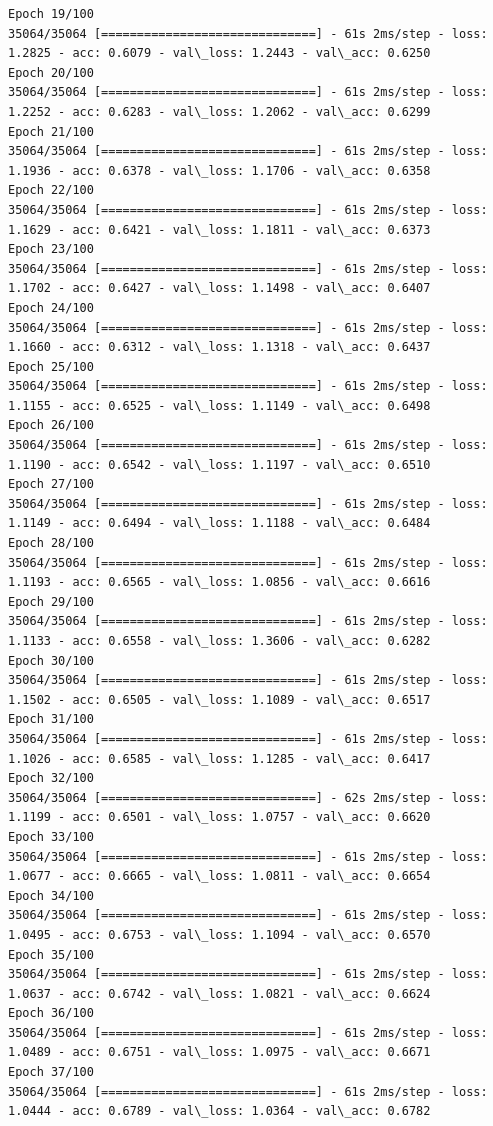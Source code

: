 \documentclass[11pt]{article}
\begin{document}
\begin{Verbatim}[commandchars=\\\{\}]
Epoch 19/100
35064/35064 [==============================] - 61s 2ms/step - loss: 1.2825 - acc: 0.6079 - val\_loss: 1.2443 - val\_acc: 0.6250
Epoch 20/100
35064/35064 [==============================] - 61s 2ms/step - loss: 1.2252 - acc: 0.6283 - val\_loss: 1.2062 - val\_acc: 0.6299
Epoch 21/100
35064/35064 [==============================] - 61s 2ms/step - loss: 1.1936 - acc: 0.6378 - val\_loss: 1.1706 - val\_acc: 0.6358
Epoch 22/100
35064/35064 [==============================] - 61s 2ms/step - loss: 1.1629 - acc: 0.6421 - val\_loss: 1.1811 - val\_acc: 0.6373
Epoch 23/100
35064/35064 [==============================] - 61s 2ms/step - loss: 1.1702 - acc: 0.6427 - val\_loss: 1.1498 - val\_acc: 0.6407
Epoch 24/100
35064/35064 [==============================] - 61s 2ms/step - loss: 1.1660 - acc: 0.6312 - val\_loss: 1.1318 - val\_acc: 0.6437
Epoch 25/100
35064/35064 [==============================] - 61s 2ms/step - loss: 1.1155 - acc: 0.6525 - val\_loss: 1.1149 - val\_acc: 0.6498
Epoch 26/100
35064/35064 [==============================] - 61s 2ms/step - loss: 1.1190 - acc: 0.6542 - val\_loss: 1.1197 - val\_acc: 0.6510
Epoch 27/100
35064/35064 [==============================] - 61s 2ms/step - loss: 1.1149 - acc: 0.6494 - val\_loss: 1.1188 - val\_acc: 0.6484
Epoch 28/100
35064/35064 [==============================] - 61s 2ms/step - loss: 1.1193 - acc: 0.6565 - val\_loss: 1.0856 - val\_acc: 0.6616
Epoch 29/100
35064/35064 [==============================] - 61s 2ms/step - loss: 1.1133 - acc: 0.6558 - val\_loss: 1.3606 - val\_acc: 0.6282
Epoch 30/100
35064/35064 [==============================] - 61s 2ms/step - loss: 1.1502 - acc: 0.6505 - val\_loss: 1.1089 - val\_acc: 0.6517
Epoch 31/100
35064/35064 [==============================] - 61s 2ms/step - loss: 1.1026 - acc: 0.6585 - val\_loss: 1.1285 - val\_acc: 0.6417
Epoch 32/100
35064/35064 [==============================] - 62s 2ms/step - loss: 1.1199 - acc: 0.6501 - val\_loss: 1.0757 - val\_acc: 0.6620
Epoch 33/100
35064/35064 [==============================] - 61s 2ms/step - loss: 1.0677 - acc: 0.6665 - val\_loss: 1.0811 - val\_acc: 0.6654
Epoch 34/100
35064/35064 [==============================] - 61s 2ms/step - loss: 1.0495 - acc: 0.6753 - val\_loss: 1.1094 - val\_acc: 0.6570
Epoch 35/100
35064/35064 [==============================] - 61s 2ms/step - loss: 1.0637 - acc: 0.6742 - val\_loss: 1.0821 - val\_acc: 0.6624
Epoch 36/100
35064/35064 [==============================] - 61s 2ms/step - loss: 1.0489 - acc: 0.6751 - val\_loss: 1.0975 - val\_acc: 0.6671
Epoch 37/100
35064/35064 [==============================] - 61s 2ms/step - loss: 1.0444 - acc: 0.6789 - val\_loss: 1.0364 - val\_acc: 0.6782

\end{Verbatim}
\end{document}
